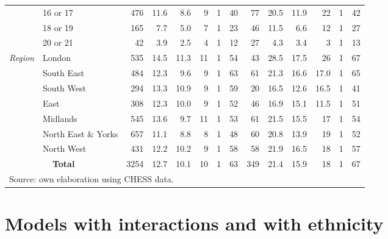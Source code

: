 \documentclass[review]{elsarticle}
\begin{document}
\begin{landscape}
\begin{table}[htb]
\begin{tabular}{cc|rrrrrr|rrrrrr}
          & \multicolumn{1}{l|}{16 or 17} & 476   & 11.6  & 8.6   & 9     & 1     & 40    & 77    & 20.5  & 11.9  & 22    & 1     & 42 \\
          & \multicolumn{1}{l|}{18 or 19} & 165   & 7.7   & 5.0   & 7     & 1     & 23    & 46    & 11.5  & 6.6   & 12    & 1     & 27 \\
          & \multicolumn{1}{l|}{20 or 21} & 42    & 3.9   & 2.5   & 4     & 1     & 12    & 27    & 4.3   & 3.4   & 3     & 1     & 13 \\
    \midrule
    \multicolumn{1}{c}{\multirow{7}[2]{0.11\textwidth}{\textit{Region}}} & \multicolumn{1}{l|}{London} & 535   & 14.5  & 11.3  & 11    & 1     & 54    & 43    & 28.5  & 17.5  & 26    & 1     & 67 \\
          & \multicolumn{1}{l|}{South East} & 484   & 12.3  & 9.6   & 9     & 1     & 63    & 61    & 21.3  & 16.6  & 17.0  & 1     & 65 \\
          & \multicolumn{1}{l|}{South West} & 294   & 13.3  & 10.9  & 9     & 1     & 59    & 20    & 16.5  & 12.6  & 16.5  & 1     & 41 \\
          & \multicolumn{1}{l|}{East} & 308   & 12.3  & 10.0  & 9     & 1     & 52    & 46    & 16.9  & 15.1  & 11.5  & 1     & 51 \\
          & \multicolumn{1}{l|}{Midlands} & 545   & 13.6  & 9.7   & 11    & 1     & 53    & 61    & 21.5  & 15.5  & 17    & 1     & 54 \\
          & \multicolumn{1}{l|}{North East \& Yorks} & 657   & 11.1  & 8.8   & 8     & 1     & 48    & 60    & 20.8  & 13.9  & 19    & 1     & 52 \\
          & \multicolumn{1}{l|}{North West} & 431   & 12.2  & 10.2  & 9     & 1     & 58    & 58    & 21.9  & 16.5  & 18    & 1     & 57 \\
    \midrule
    \multicolumn{2}{c|}{\textbf{Total}} & 3254  & 12.7  & 10.1  & 10    & 1     & 63    & 349   & 21.4  & 15.9  & 18    & 1     & 67 \\
    \bottomrule
    \multicolumn{14}{l}{\scriptsize{Source: own elaboration using CHESS data.}}
    \end{tabular}%
  \label{tab:descriptives}%
\end{table}%
\end{landscape}

\newpage 

\section{Models with interactions and with ethnicity \label{sec:other_models}}
\end{document}
